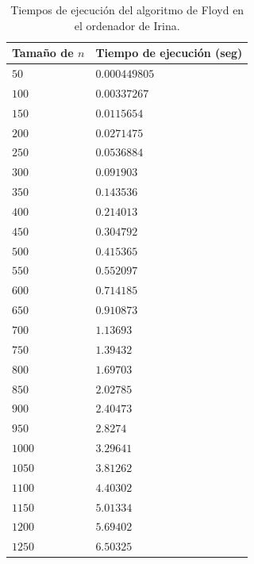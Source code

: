 \documentclass[12pt]{article}
\begin{document}
    \begin{table}
        \centering
        \begin{tabular}{|l|l|}
            \hline
            Tamaño de $n$ & Tiempo de ejecución (seg) \\
            \hline
            $50 $ & $0.000449805 $\\
            $100$ & $0.00337267 $\\
            $150$ & $0.0115654 $\\
            $200$ & $0.0271475 $\\
            $250$ & $0.0536884 $\\
            $300$ & $0.091903 $\\
            $350$ & $0.143536 $\\
            $400$ & $0.214013 $\\
            $450$ & $0.304792 $\\
            $500$ & $0.415365 $\\
            $550$ & $0.552097 $\\
            $600$ & $0.714185 $\\
            $650$ & $0.910873 $\\
            $700$ & $1.13693 $\\
            $750$ & $1.39432 $\\
            $800$ & $1.69703 $\\
            $850$ & $2.02785 $\\
            $900$ & $2.40473 $\\
            $950$ & $2.8274 $\\
            $1000$&$3.29641 $\\
            $1050$&$3.81262 $\\
            $1100$&$4.40302 $\\
            $1150$&$5.01334 $\\
            $1200$&$5.69402 $\\
            $1250$&$6.50325 $\\
            \hline
        \end{tabular}
        \caption{Tiempos de ejecución del algoritmo de Floyd en el ordenador de Irina.}
        \label{tab:Floyd_tiempos}
    \end{table}   
\end{document}
